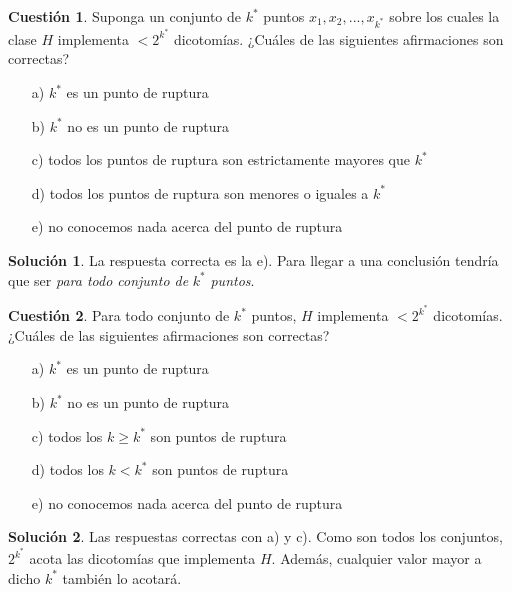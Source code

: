 \documentclass[a4paper, 11pt]{article}
\theoremstyle{definition}
\newtheorem{cuestion}{Cuestión}
\newtheorem*{solucion}{Solución}
\begin{document}
  \begin{cuestion}
  Suponga un conjunto de $k^*$ puntos $x_1,x_2,...,x_{k^*}$ sobre los cuales la clase $H$ implementa $<2^{k^*}$ dicotomías. ¿Cuáles de las siguientes afirmaciones son correctas?
  \begin{enumerate}
  \item[a)] $k^*$ es un punto de ruptura
  \item[b)] $k^*$ no es un punto de ruptura
  \item[c)] todos los puntos de ruptura son estrictamente mayores que $k^*$
  \item[d)] todos los puntos de ruptura son menores o iguales a $k^*$
  \item[e)] no conocemos nada acerca del punto de ruptura
  \end{enumerate}

  \end{cuestion}

  \begin{solucion}
    La respuesta correcta es la e). Para llegar a una conclusión tendría que ser \emph{para todo conjunto de} $k^*$ \emph{puntos}.
  \end{solucion}

  \begin{cuestion}
  Para todo conjunto de $k^*$ puntos, $H$ implementa $<2^{k^*}$ dicotomías. ¿Cuáles de las siguientes afirmaciones son correctas?
  \begin{enumerate}
  \item[a)] $k^*$ es un punto de ruptura
  \item[b)] $k^*$ no es un punto de ruptura
  \item[c)] todos los $k \geq k^*$ son puntos de ruptura
  \item[d)] todos los $k < k^*$ son puntos de ruptura
  \item[e)] no conocemos nada acerca del punto de ruptura
  \end{enumerate}
  \end{cuestion}

  \begin{solucion}
    Las respuestas correctas con a) y c). Como son todos los conjuntos, $2^{k^*}$ acota las dicotomías que implementa $H$. Además, cualquier valor mayor a dicho $k^*$ también lo acotará.
  \end{solucion}
\end{document}
